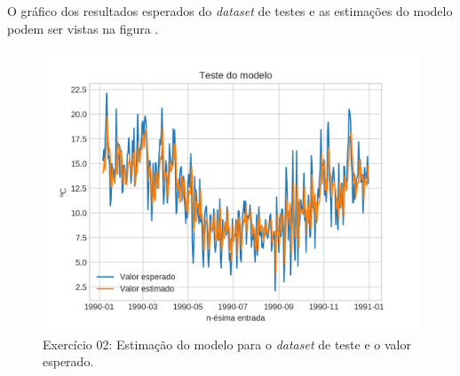 \documentclass{article}
\begin{document}
    O gráfico dos resultados esperados do \textit{dataset} de testes e as estimações do modelo podem ser vistas na figura . 
    \begin{figure}[H]
        \centering
        \includegraphics[width=\linewidth]{ex02/model_test.png}
        \caption{Exercício 02: Estimação do modelo para o \textit{dataset} de teste e o valor esperado.}
        \label{fig:ex2_comp}
    \end{figure}
\end{document}
